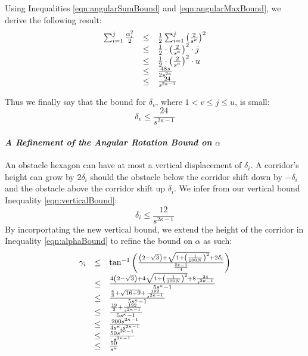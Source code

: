 Using Inequalities \ref{eqn:angularSumBound} and \ref{eqn:angularMaxBound}, we derive the following result:
$$
\begin{array}{rcl}
\sum_{i=1}^j \frac{\alpha_i^2}{2} &\leq& \frac{1}{2}\sum_{i=1}^j  \left(  \frac{2}{s^\kappa}  \right)^2\\
&\leq&\frac{1}{2}\cdot  \left( \frac{2}{s^{\kappa}} \right)^2 \cdot j\\
&\leq&\frac{1}{2}\cdot  \left( \frac{2}{s^{\kappa}} \right)^2 \cdot u\\
&\leq&\frac{48s}{2s^{2\kappa}}\\
&\leq&\frac{24}{s^{2\kappa-1}}\\  
\end{array}
$$

Thus we finally say that the bound for $\delta_v$, where $1<v\leq j\leq u$, is small:
\begin{equation}\label{eqn:verticalBound}
\delta_v \leq \frac{24}{s^{2\kappa-1}}
\end{equation}


\paragraph{\textit{A Refinement of the Angular Rotation Bound on $\alpha$}}
An obstacle hexagon can have at most a vertical displacement of $\delta_i$.  
A corridor's height can grow by $2 \delta_i$ should the obstacle below the corridor shift down by $-\delta_i$ and the obstacle above the corridor shift up $\delta_i$.  
We infer from our vertical bound Inequality \ref{eqn:verticalBound}:
$$\delta_i \leq \frac{12}{s^{2\kappa-1}}$$
By incorportating the new vertical bound, we extend the height of the corridor in Inequality \ref{eqn:alphaBound} to refine the bound on $\alpha$ as such:
\begin{equation}\label{eqn:alphaBoundRefined}
\begin{array}{rcl}
\gamma_i & \leq & \tan^{-1} \left( 
								\frac{\left( 2 - \sqrt{3} \right) + \sqrt{1 + \left( \frac{1}{100N} \right)^2}	+ 2 \delta_i}
									 {	\frac{5t -1}{4}	}
								 \right)\\
& \leq & \frac{
				4 \left( 2 - \sqrt{3} \right) + 4\sqrt{1 + \left( \frac{1}{100N} \right)^2} + 8 \frac{24}{s^{2\kappa-1}}	}
			  {	
			  	5s^\kappa -1	
			  }\\
& \leq & \frac{
				\frac{4}{3} + \sqrt{16 + 9}	+  \frac{192}{s^{2\kappa-1}} }
			  {	
			  	5s^\kappa -1	
			  } \\

& \leq & \frac{\frac{19}{3}+\frac{192}{s^{2\kappa-1}}}{5 s^\kappa-1} \\
& \leq & \frac{200s^{2\kappa-1}}{4 s^\kappa \cdot s^{2\kappa-1}} \\
& \leq & \frac{50s^{2\kappa-1}}{ s^{3\kappa-1}} \\
&\leq& \frac{50}{s^{\kappa}}\\
\end{array} 
\end{equation}